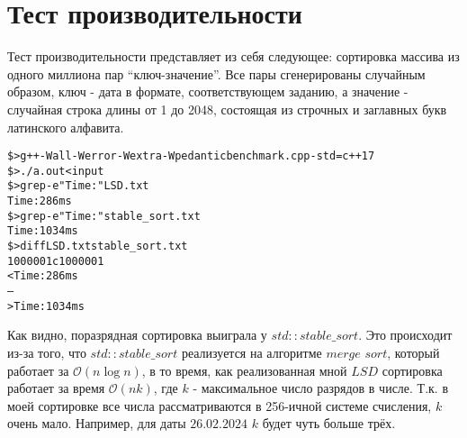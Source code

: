\section{Тест производительности}


Тест производительности представляет из себя следующее: сортировка массива из одного миллиона пар \enquote{ключ-значение}. Все пары сгенерированы случайным образом, ключ - дата в формате, соответствующем заданию, а значение - случайная строка длины от 1 до 2048, состоящая из строчных и заглавных букв латинского алфавита.

\begin{alltt}
\$> g++ -Wall -Werror -Wextra -Wpedantic benchmark.cpp -std=c++17
\$> ./a.out < input
\$> grep -e "Time:" LSD.txt
Time: 286ms
\$> grep -e "Time:" stable_sort.txt
Time: 1034ms
\$> diff LSD.txt stable_sort.txt
1000001c1000001
< Time: 286ms
---
> Time: 1034ms
\end{alltt}

Как видно, поразрядная сортировка выиграла у $std::stable\_sort$. Это происходит из-за того, что $std::stable\_sort$ реализуется на алгоритме $merge$ $sort$, который работает за $\mathcal{O}(n\log{}n)$, в то время, как реализованная мной $LSD$ сортировка работает за время $\mathcal{O}(nk)$, где $k$ - максимальное число разрядов в числе. Т.к. в моей сортировке все числа рассматриваются в 256-ичной системе счисления, $k$ очень мало. Например, для даты $26.02.2024$ $k$ будет чуть больше трёх. 

\pagebreak


